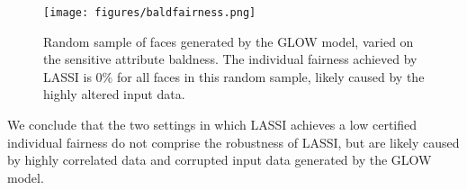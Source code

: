 \begin{figure}[H]
\centering
    \texttt{[image: figures/baldfairness.png]}
    \caption{Random sample of faces generated by the GLOW model, varied on the sensitive attribute baldness. The individual fairness achieved by LASSI is 0\% for all faces in this random sample, likely caused by the highly altered input data.}
    \label{fig:bald_vis}
\end{figure}

We conclude that the two settings in which LASSI achieves a low certified individual fairness do not comprise the robustness of LASSI, but are likely caused by highly correlated data and corrupted input data generated by the GLOW model.



